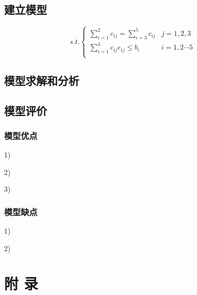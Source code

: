 \documentclass{cumcmart}
\begin{document}
\subsection{建立模型}

    
    \[ %
    s.t.
    \left\{  
    \begin{array}{ll}  
    \sum\limits_{i=1}^{2}{c_{ij}} = \sum\limits_{i=3}^{5}{c_{ij}} & j  = 1,2,3  \\ 
     \sum\limits_{i=1}^{3}{c_{ij}e_{ij}} \leqslant b_{i} & i = 1,2 \cdots 5 \\
    \end{array}  
    \right.
    \] %

\subsection{模型求解和分析}
 

\subsection{模型评价}
\subsubsection{模型优点}
1)	

2)	

3)	

\subsubsection{模型缺点}
1)	

2)	





\newpage
\appendix
\section*{附 \quad 录}
\end{document}
